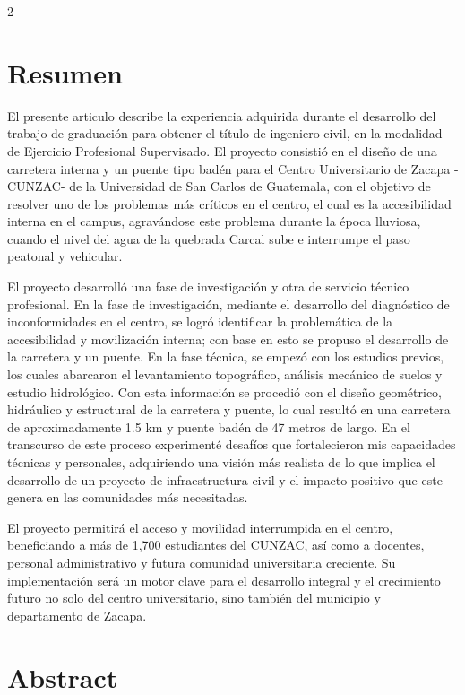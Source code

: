 \documentclass[12pt,spanish,Letterpaper,openany]{book}
\begin{document}
\begin {multicols}{2}

\hypertarget{resumen-2}{%
\section{Resumen}\label{resumen-2}}

El presente articulo describe la experiencia adquirida durante el desarrollo del trabajo de graduación para obtener el título de ingeniero civil, en la modalidad de Ejercicio Profesional Supervisado. El proyecto consistió en el diseño de una carretera interna y un puente tipo badén para el Centro Universitario de Zacapa -CUNZAC- de la Universidad de San Carlos de Guatemala, con el objetivo de resolver uno de los problemas más críticos en el centro, el cual es la accesibilidad interna en el campus, agravándose este problema durante la época lluviosa, cuando el nivel del agua de la quebrada Carcal sube e interrumpe el paso peatonal y vehicular.

El proyecto desarrolló una fase de investigación y otra de servicio técnico profesional. En la fase de investigación, mediante el desarrollo del diagnóstico de inconformidades en el centro, se logró identificar la problemática de la accesibilidad y movilización interna; con base en esto se propuso el desarrollo de la carretera y un puente. En la fase técnica, se empezó con los estudios previos, los cuales abarcaron el levantamiento topográfico, análisis mecánico de suelos y estudio hidrológico. Con esta información se procedió con el diseño geométrico, hidráulico y estructural de la carretera y puente, lo cual resultó en una carretera de aproximadamente 1.5 km y puente badén de 47 metros de largo. En el transcurso de este proceso experimenté desafíos que fortalecieron mis capacidades técnicas y personales, adquiriendo una visión más realista de lo que implica el desarrollo de un proyecto de infraestructura civil y el impacto positivo que este genera en las comunidades más necesitadas.

El proyecto permitirá el acceso y movilidad interrumpida en el centro, beneficiando a más de 1,700 estudiantes del CUNZAC, así como a docentes, personal administrativo y futura comunidad universitaria creciente. Su implementación será un motor clave para el desarrollo integral y el crecimiento futuro no solo del centro universitario, sino también del municipio y departamento de Zacapa.

\hypertarget{abstract-2}{%
\section{Abstract}\label{abstract-2}}


\end{multicols}
\end{document}
